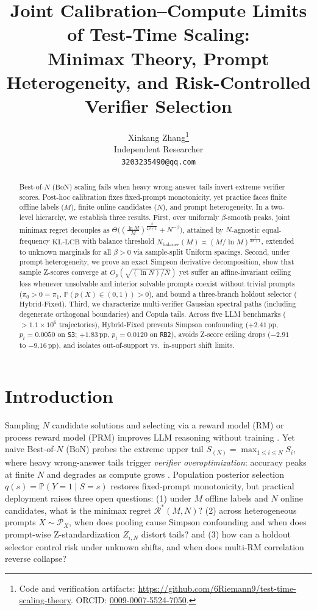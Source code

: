 \documentclass{article}
\title{Joint Calibration--Compute Limits of Test-Time Scaling:\\
Minimax Theory, Prompt Heterogeneity, and Risk-Controlled Verifier Selection}
\author{%
  Xinkang Zhang\thanks{Code and verification artifacts: \url{https://github.com/6Riemann9/test-time-scaling-theory}. ORCID: \href{https://orcid.org/0009-0007-5524-7050}{0009-0007-5524-7050}.} \\
  Independent Researcher \\
  \texttt{3203235490@qq.com}
}
\theoremstyle{plain}
\theoremstyle{definition}
\theoremstyle{remark}
\newcommand{\Prob}{\mathbb{P}}
\begin{document}
\maketitle

\begin{abstract}
Best-of-$N$ ($\mathrm{BoN}$) scaling fails when heavy wrong-answer tails invert extreme verifier scores. Post-hoc calibration fixes fixed-prompt monotonicity, yet practice faces finite offline labels ($M$), finite online candidates ($N$), and prompt heterogeneity. In a two-level hierarchy, we establish three results. First, over uniformly $\beta$-smooth peaks, joint minimax regret decouples as $\Theta\!\big((\frac{\ln M}{M})^{\frac{\beta}{2\beta+1}} + N^{-\beta}\big)$, attained by $N$-agnostic equal-frequency $\mathrm{KL\text{-}LCB}$ with balance threshold $N_{\mathrm{balance}}(M) \asymp (M/\ln M)^{\frac{1}{2\beta+1}}$, extended to unknown marginals for all $\beta > 0$ via sample-split Uniform spacings. Second, under prompt heterogeneity, we prove an exact Simpson derivative decomposition, show that sample Z-scores converge at $O_p(\sqrt{(\ln N)/N})$ yet suffer an affine-invariant ceiling loss whenever unsolvable and interior solvable prompts coexist without trivial prompts ($\pi_0 > 0 = \pi_1$, $\Prob(p(X)\in(0,1))>0$), and bound a three-branch holdout selector ($\mathrm{Hybrid\text{-}Fixed}$). Third, we characterize multi-verifier Gaussian spectral paths (including degenerate orthogonal boundaries) and Copula tails. Across five LLM benchmarks ($>1.1\times 10^6$ trajectories), $\mathrm{Hybrid\text{-}Fixed}$ prevents Simpson confounding ($+2.41\,\mathrm{pp}$, $p_t=0.0050$ on \texttt{S3}; $+1.83\,\mathrm{pp}$, $p_t=0.0120$ on \texttt{RB2}), avoids Z-score ceiling drops ($-2.91$ to $-9.16\,\mathrm{pp}$), and isolates out-of-support vs.\ in-support shift limits.
\end{abstract}

\section{Introduction}
\label{sec:intro}

Sampling $N$ candidate solutions and selecting via a reward model (RM) or process reward model (PRM) improves LLM reasoning without training \citep{gao2023scaling,brown2024large,snell2024scaling}. Yet naive Best-of-$N$ ($\mathrm{BoN}$) probes the extreme upper tail $S_{(N)} = \max_{1\le i\le N} S_i$, where heavy wrong-answer tails trigger \emph{verifier overoptimization}: accuracy peaks at finite $N$ and degrades as compute grows \citep{gao2023scaling,stroebl2024inference,huang2025best,dorner2025roc,yano2026tail,gui2026whether}. Population posterior selection $q(s) = \Prob(Y=1 \mid S=s)$ restores fixed-prompt monotonicity, but practical deployment raises three open questions: (1) under $M$ offline labels and $N$ online candidates, what is the minimax regret $\mathcal{R}^*(M, N)$? (2) across heterogeneous prompts $X \sim \mathcal{P}_X$, when does pooling cause Simpson confounding and when does prompt-wise Z-standardization $Z_{i,N}$ distort tails? and (3) how can a holdout selector control risk under unknown shifts, and when does multi-RM correlation reverse collapse?
\end{document}

